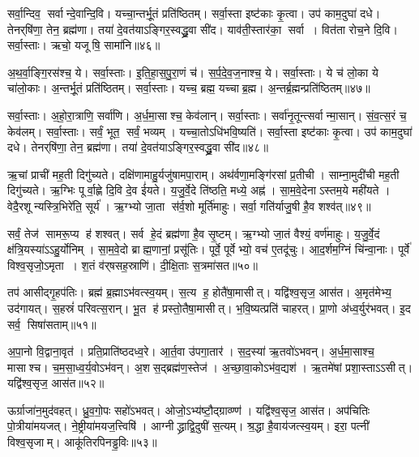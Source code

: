    सर्वा॒न्दिव॒ सर्वान्दे॒वान्दि॒वि।
   यच्चा॒न्तर्भू॒तं प्रति॑ष्ठितम्।
   सर्वा॒स्ता इष्ट॑काः कृ॒त्वा।
   उप॑ काम॒दुघा॑ दधे।
   तेनर्‌षि॑णा॒ तेन॒ ब्रह्म॑णा।
   तया॑ दे॒वत॑याऽङ्गिर॒स्वद्ध्रु॒वा सी॑द।
   याव॑ती॒स्तार॑का॒ सर्वा।
   वित॑ता रोच॒ने दि॒वि।
   सर्वा॒स्ताः।
   ऋचो॒ यजूषि॒ सामा॑नि॥४६॥

   अ॒थ॒र्वा॒ङ्गि॒रस॑श्च॒ ये।
   सर्वा॒स्ताः।
   इ॒ति॒हा॒स॒पु॒रा॒णं च॑।
   स॒र्प॒दे॒व॒ज॒नाश्च॒ ये।
   सर्वा॒स्ताः।
   ये च॑ लो॒का ये चा॑लो॒काः।
   अ॒न्तर्भू॒तं प्रति॑ष्ठितम्।
   सर्वा॒स्ताः।
   यच्च॒ ब्रह्म॒ यच्चाब्र॒ह्म।
   अ॒न्तर्ब्र॒ह्मन्प्रति॑ष्ठितम्॥४७॥

   सर्वा॒स्ताः।
   अ॒हो॒रा॒त्राणि॒ सर्वा॑णि।
   अ॒र्ध॒मा॒साश्च॒ केव॑लान्।
   सर्वा॒स्ताः।
   सर्वा॑नृ॒तून्त्सर्वान्मा॒सान्।
   सं॒व॒त्स॒रं च॒ केव॑लम्।
   सर्वा॒स्ताः।
   सर्वं॒ भूत॒ सर्वं॒ भव्यम्।
   यच्चा॒तोऽधि॑भवि॒ष्यति॑।
   सर्वा॒स्ता इष्ट॑काः कृ॒त्वा।
   उप॑ काम॒दुघा॑ दधे।
   तेनर्‌षि॑णा॒ तेन॒ ब्रह्म॑णा।
   तया॑ दे॒वत॑याऽङ्गिर॒स्वद्ध्रु॒वा सी॑द॥४८॥
\anuvakamend
  
   ऋ॒चां प्राची॑ मह॒ती दिगु॑च्यते।
   दक्षि॑णामाहु॒र्यजु॑षामपा॒राम्।
   अथ॑र्वणा॒मङ्गि॑रसां प्र॒तीची।
   साम्ना॒मुदी॑ची मह॒ती दिगु॑च्यते।
   ऋ॒ग्भिः पूर्वा॒ह्णे दि॒वि दे॒व ई॑यते।
   य॒जु॒र्वे॒दे ति॑ष्ठति॒ मध्ये॒ अह्न॑।
   सा॒म॒वे॒देनाऽस्तम॒ये मही॑यते ।
   वेदै॒रशून्यस्त्रि॒भिरे॑ति॒ सूर्य॑।
   ऋ॒ग्भ्यो जा॒ता स॑र्व॒शो मूर्ति॑माहुः।
   सर्वा॒ गति॑र्याजु॒षी है॒व शश्व॑त्॥४९॥

   सर्वं॒ तेज॑ सामरू॒प्य ह॑ शश्वत्।
   सर्व हे॒दं ब्रह्म॑णा है॒व सृ॒ष्टम्।
   ऋ॒ग्भ्यो जा॒तं वैश्यं॒ वर्ण॑माहुः।
   य॒जु॒र्वे॒दं क्ष॑त्रि॒यस्या॑ऽऽहु॒र्योनिम्।
   सा॒म॒वे॒दो ब्राह्म॒णानां॒ प्रसू॑तिः।
   पूर्वे॒ पूर्वेभ्यो॒ वच॑ ए॒तदू॑चुः।
   आ॒द॒र्\mbox{}शम॒ग्निं चि॑न्वा॒नाः।
   पूर्वे॑ विश्व॒सृजो॒ऽमृता।
   श॒तं व॑र्‌षसह॒स्राणि॑।
   दी॒क्षि॒ताः स॒त्रमा॑सत॥५०॥

   तप॑ आसीद्गृ॒हप॑तिः।
   ब्रह्म॑ ब्र॒ह्माऽभ॑वत्स्व॒यम्।
   स॒त्य ह॒ होतै॑षा॒मासीत्।
   यद्वि॑श्व॒सृज॒ आस॑त।
   अ॒मृत॑मेभ्य॒ उद॑गायत्।
   स॒हस्रं॑ परिवत्स॒रान्।
   भू॒त ह॑ प्रस्तो॒तैषा॒मासीत्।
   भ॒वि॒ष्यत्प्रति॑ चाहरत्।
   प्रा॒णो अ॑ध्व॒र्युर॑भवत्।
   इ॒द सर्व॒ सिषा॑सताम्॥५१॥

   अ॒पा॒नो वि॒द्वाना॒वृत॑।
   प्रति॒प्राति॑ष्ठदध्व॒रे।
   आ॒र्त॒वा उ॑पगा॒तार॑।
   स॒द॒स्या॑ ऋ॒तवो॑ऽभवन्।
   अ॒र्ध॒मा॒साश्च॒ मासाश्च।
   च॒म॒सा॒ध्व॒र्य॒वोऽभ॑वन्।
   अ॒शस॒द्ब्रह्म॑ण॒स्तेज॑।
   अ॒च्छा॒वा॒कोऽभ॑व॒द्यश॑।
   ऋ॒तमे॑षां प्रशा॒स्ताऽऽसीत्।
   यद्वि॑श्व॒सृज॒ आस॑त॥५२॥

   ऊर्ग्राजा॑न॒मुद॑वहत्।
   ध्रु॒व॒गो॒पः सहो॑ऽभवत्।
   ओजो॒ऽभ्य॑ष्टौ॒\-द्ग्राव्ण्ण॑।
   यद्वि॑श्व॒सृज॒ आस॑त।
   अप॑चितिः पो॒त्रीया॑मयजत्।
   ने॒ष्ट्रीया॑म\-यज॒त्त्विषि॑।
   आग्नीद्ध्राद्वि॒दुषी॑ स॒त्यम्।
   श्र॒द्धा है॒वाय॑जत्स्व॒यम्।
   इरा॒ पत्नी॑ विश्व॒सृजाम्।
   आकू॑तिरपिन\-ड्ढ॒विः॥५३॥


